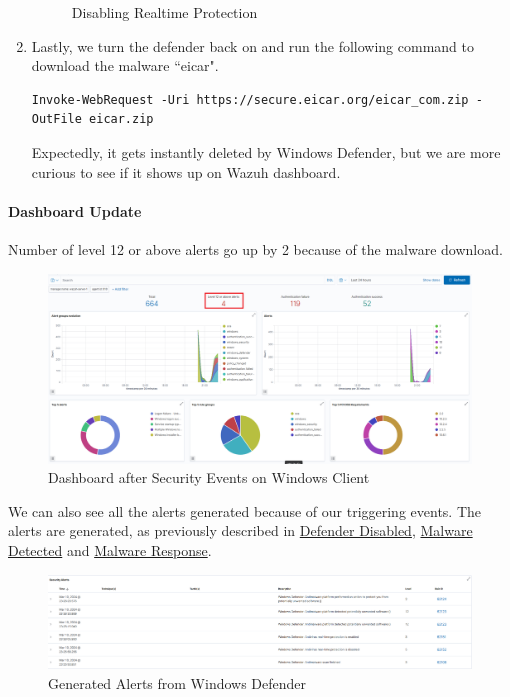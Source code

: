 \begin{enumerate}
\begin{figure}[H]
        \caption{Disabling Realtime Protection}
        \label{fig:win-disable-defender}
    \end{figure}
    \item Lastly, we turn the defender back on and run the following command to download the malware ``eicar".
    \begin{verbatim}
Invoke-WebRequest -Uri https://secure.eicar.org/eicar_com.zip -OutFile eicar.zip
    \end{verbatim}
    Expectedly, it gets instantly deleted by Windows Defender, but we are more curious to see if it shows up on Wazuh dashboard.
\end{enumerate}

\paragraph{Dashboard Update}
Number of level 12 or above alerts go up by 2 because of the malware download.
    \begin{figure}[H]
        \centering
        \includegraphics[width=\textwidth]{images/malware-detection/windows-log/5.png}
        \caption{Dashboard after Security Events on Windows Client}
        \label{fig:win-dashboard}
    \end{figure}
We can also see all the alerts generated because of our triggering events. The alerts are generated, as previously described in \hyperlink{defender-disabled}{Defender Disabled}, \hyperlink{detect-malware}{Malware Detected} and \hyperlink{response-malware}{Malware Response}.
    \begin{figure}[H]
        \centering
        \includegraphics[width=\textwidth]{images/malware-detection/windows-log/4.png}
        \caption{Generated Alerts from Windows Defender}
        \label{fig:win-def-alerts}
    \end{figure}
